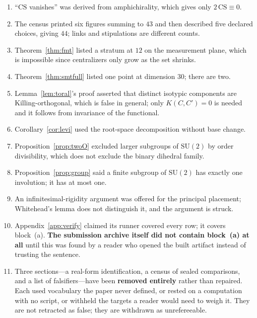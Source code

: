 \documentclass[11pt,reqno]{amsart}
\theoremstyle{plain}
\theoremstyle{definition}
\theoremstyle{remark}
\newcommand{\SU}{\mathrm{SU}}
\begin{document}
\begin{enumerate}[leftmargin=2.2em,itemsep=1pt]
  \textbf{non-arithmetic} bundles and removes the arithmetic words---which include the
  golden and silver members. \textbf{Three of those four moves were made without opening
  the source.} The family's amphichirality is now proved directly
  (Theorem~\ref{thm:amphi}) and cites nothing; see Scope~\ref{sc:ghh}.
\item ``$\mathrm{CS}$ vanishes'' was derived from amphichirality, which gives only
  $2\,\mathrm{CS}\equiv0$.
\item The census printed six figures summing to $43$ and then described five declared
  choices, giving $44$; links and stipulations are different counts.
\item Theorem~\ref{thm:fmt} listed a stratum at $12$ on the measurement plane, which is
  impossible since centralizers only grow as the set shrinks.
\item Theorem~\ref{thm:smtfull} listed one point at dimension $30$; there are two.
\item Lemma~\ref{lem:toral}'s proof asserted that distinct isotypic components are
  Killing-orthogonal, which is false in general; only $K(C,C')=0$ is needed and it
  follows from invariance of the functional.
\item Corollary~\ref{cor:levi} used the root-space decomposition without base change.
\item Proposition~\ref{prop:twoO} excluded larger subgroups of $\SU(2)$ by order
  divisibility, which does not exclude the binary dihedral family.
\item Proposition~\ref{prop:group} said a finite subgroup of $\SU(2)$ has exactly one
  involution; it has at most one.
\item An infinitesimal-rigidity argument was offered for the principal placement;
  Whitehead's lemma does not distinguish it, and the argument is struck.
\item Appendix~\ref{app:verify} claimed its runner covered every row; it covers
  block~(a). \textbf{The submission archive itself did not contain block~(a) at all}
  until this was found by a reader who opened the built artifact instead of trusting the
  sentence.
\item Three sections---a real-form identification, a census of sealed comparisons, and a
  list of falsifiers---have been \textbf{removed entirely} rather than repaired. Each
  used vocabulary the paper never defined, or rested on a computation with no script, or
  withheld the targets a reader would need to weigh it. They are not retracted as false;
  they are withdrawn as unrefereeable.
\end{enumerate}
\end{document}
